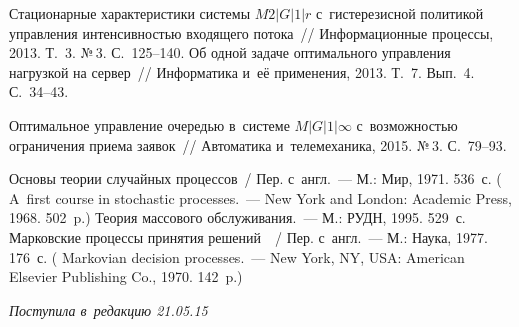 \begin{multicols}{2}
{{\begin{thebibliography}{99}
 Стационарные характеристики
системы $M2\vert G\vert 1\vert r$ с~гистерезисной политикой управления
интенсивностью входящего потока~// Информационные процессы, 2013.
Т.~3. №\,3. С.~125--140.
 Об одной задаче оптимального управ\-ле\-ния нагрузкой на
сервер~// Информатика и~её применения, 2013. Т.~7. Вып.~4. С.~34--43.

 Оптимальное управление очередью в~системе
$M\vert G\vert 1\vert \infty$ с~возможностью ограничения приема заявок~//
Автоматика и~телемеханика, 2015. №\,3. С.~79--93.

 Основы теории случайных процессов~/
Пер. с~англ.~--- М.: Мир, 1971. 536~с.
(  {A~first course in stochastic processes}.~---
New York and London: Academic Press, 1968. 502~p.)
 Теория массового обслуживания.~---
М.: РУДН, 1995. 529~с.
 Марковские процессы принятия решений~~/
Пер. с~англ.~--- М.: Наука, 1977. 176~с.
( {Markovian decision processes}.~---
New York, NY, USA: American Elsevier Publishing Co., 1970. 142~p.)
 \end{thebibliography}

 }
 }

\end{multicols}

\vspace*{-12pt}

\hfill{\small\textit{Поступила в~редакцию 21.05.15}}

\newpage





\vspace*{-24pt}

\def\tit{THE THRESHOLD STRATEGY FOR~RESTRICTING ACCESS 
IN~THE~$M/D/1$ QUEUEING SYSTEM WITH~PENALTY FUNCTION FOR~LATE SERVICE}

\def\titkol{The threshold strategy for restricting access 
in the $M/D/1$ queueing system with penalty function for late service}

\def\aut{Ya.\,M.~Agalarov}

\def\autkol{Ya.\,M.~Agalarov}

